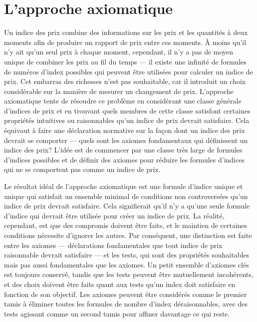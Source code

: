 \documentclass[]{article}
\begin{document}
\hypertarget{lapproche-axiomatique}{%
\section{L'approche axiomatique}\label{lapproche-axiomatique}}

Un indice des prix combine des informations sur les prix et les quantités à deux moments afin de produire un rapport de prix entre ces moments. À moins qu'il n'y ait qu'un seul prix à chaque moment, cependant, il n'y a pas de moyen unique de combiner les prix au fil du temps --- il existe une infinité de formules de numéros d'index possibles qui peuvent être utilisées pour calculer un indice de prix. Cet embarras des richesses n'est pas souhaitable, car il introduit un choix considérable sur la manière de mesurer un changement de prix. L'approche axiomatique tente de résoudre ce problème en considérant une classe générale d'indices de prix et en trouvant quels membres de cette classe satisfont certaines propriétés intuitives ou raisonnables qu'un indice de prix devrait satisfaire. Cela équivaut à faire une déclaration normative sur la façon dont un indice des prix devrait se comporter --- quels sont les axiomes fondamentaux qui définissent un indice des prix? L'idée est de commencer par une classe très large de formules d'indices possibles et de définir des axiomes pour réduire les formules d'indices qui ne se comportent pas comme un indice de prix.

Le résultat idéal de l'approche axiomatique est une formule d'indice unique et unique qui satisfait un ensemble minimal de conditions non controversées qu'un indice de prix devrait satisfaire. Cela signifierait qu'il n'y a qu'une seule formule d'indice qui devrait être utilisée pour créer un indice de prix. La réalité, cependant, est que des compromis doivent être faits, et le maintien de certaines conditions nécessite d'ignorer les autres. Par conséquent, une distinction est faite entre les axiomes --- déclarations fondamentales que tout indice de prix raisonnable devrait satisfaire --- et les tests, qui sont des propriétés souhaitables mais pas aussi fondamentales que les axiomes. Un petit ensemble d'axiomes clés est toujours conservé, tandis que les tests peuvent être mutuellement incohérents, et des choix doivent être faits quant aux tests qu'un index doit satisfaire en fonction de son objectif. Les axiomes peuvent être considérés comme le premier tamis à éliminer toutes les formules de nombre d'index déraisonnables, avec des tests agissant comme un second tamis pour affiner davantage ce qui reste.
\end{document}
